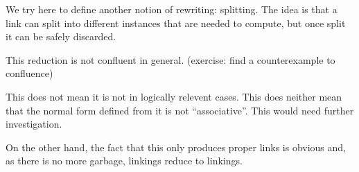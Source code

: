 We try here to define another notion of rewriting: splitting. The idea is that a link can split into different instances that are needed to compute, but once split it can be safely discarded.


This reduction is not confluent in general. (exercise: find a counterexample to confluence)

This does not mean it is not in logically relevent cases. This does neither mean that the normal form defined from it is not ``associative''. This would need further investigation.

\medskip
On the other hand, the fact that this only produces proper links is obvious and, as there is no more garbage, linkings reduce to linkings.
